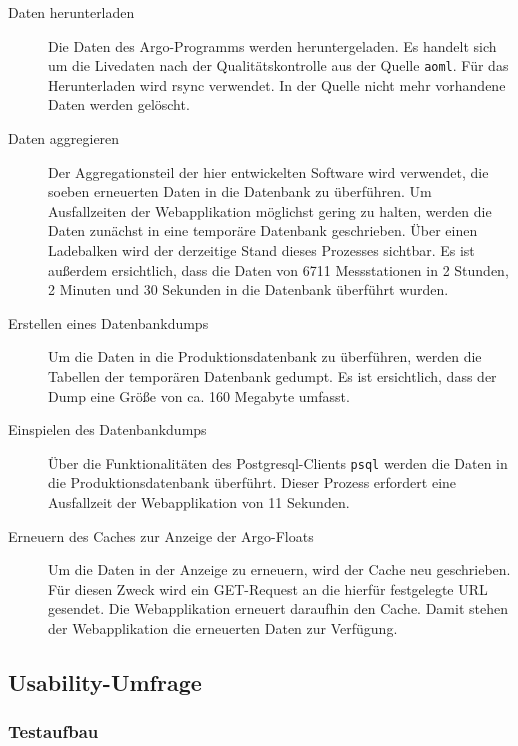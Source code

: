 \begin{description}
 \item [Daten herunterladen]
    Die Daten des Argo-Programms werden heruntergeladen. Es handelt sich um die Livedaten nach der Qualitätskontrolle aus der Quelle \texttt{aoml}. Für das Herunterladen wird rsync verwendet. In der Quelle nicht mehr vorhandene Daten werden gelöscht.


 \item [Daten aggregieren]
    Der Aggregationsteil der hier entwickelten Software wird verwendet, die soeben erneuerten Daten in die Datenbank zu überführen. Um Ausfallzeiten der Webapplikation möglichst gering zu halten, werden die Daten zunächst in eine temporäre Datenbank geschrieben. Über einen Ladebalken wird der derzeitige Stand dieses Prozesses sichtbar. Es ist außerdem ersichtlich, dass die Daten von 6711 Messstationen in 2 Stunden, 2 Minuten und 30 Sekunden in die Datenbank überführt wurden.

 \item [Erstellen eines Datenbankdumps]
    Um die Daten in die Produktionsdatenbank zu überführen, werden die Tabellen der temporären Datenbank gedumpt. Es ist ersichtlich, dass der Dump eine Größe von  ca. 160 Megabyte umfasst.

 \item [Einspielen des Datenbankdumps]
    Über die Funktionalitäten des Postgresql-Clients \newline\texttt{psql} werden die Daten in die Produktionsdatenbank überführt. Dieser Prozess erfordert eine Ausfallzeit der Webapplikation von 11 Sekunden.

 \item [Erneuern des Caches zur Anzeige der Argo-Floats]
    Um die Daten in der Anzeige zu erneuern, wird der Cache neu geschrieben. Für diesen Zweck wird ein GET-Request an die hierfür festgelegte URL gesendet. Die Webapplikation erneuert daraufhin den Cache. Damit stehen der Webapplikation die erneuerten  Daten zur Verfügung.
\end{description}



\newpage
\subsection{Usability-Umfrage}

\subsubsection{Testaufbau}

